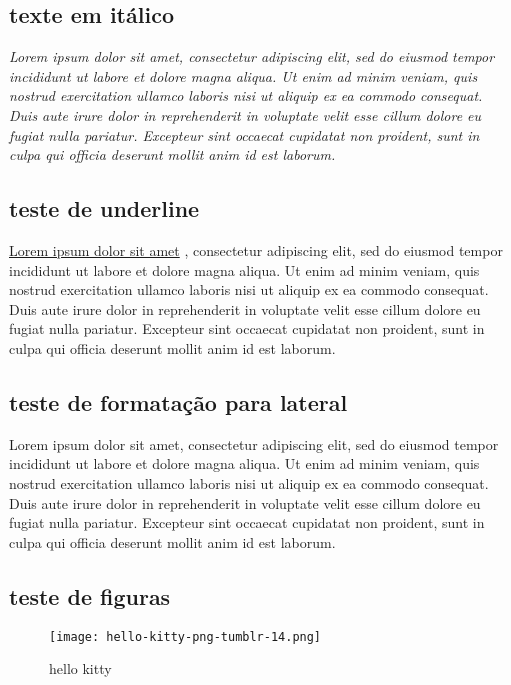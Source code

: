 \documentclass[a4paper, 12pt]{article} %
\begin{document}
\subsection{texte em itálico}
\textit{
Lorem ipsum dolor sit amet, consectetur adipiscing elit, sed do eiusmod tempor incididunt ut labore et dolore magna aliqua. Ut enim ad minim veniam, quis nostrud exercitation ullamco laboris nisi ut aliquip ex ea commodo consequat. Duis aute irure dolor in reprehenderit in voluptate velit esse cillum dolore eu fugiat nulla pariatur. Excepteur sint occaecat cupidatat non proident, sunt in culpa qui officia deserunt mollit anim id est laborum.} %

\subsection{teste de underline}
\underline{Lorem ipsum dolor sit amet} , consectetur adipiscing elit, sed do eiusmod tempor incididunt ut labore et dolore magna aliqua. Ut enim ad minim veniam, quis nostrud exercitation ullamco laboris nisi ut aliquip ex ea commodo consequat. Duis aute irure dolor in reprehenderit in voluptate velit esse cillum dolore eu fugiat nulla pariatur. Excepteur sint occaecat cupidatat non proident, sunt in culpa qui officia deserunt mollit anim id est laborum. %

\subsection{teste de formatação para lateral}
\begin{flushright}Lorem ipsum dolor sit amet, consectetur adipiscing elit, sed do eiusmod tempor incididunt ut labore et dolore magna aliqua. Ut enim ad minim veniam, quis nostrud exercitation ullamco laboris nisi ut aliquip ex ea commodo consequat. Duis aute irure dolor in reprehenderit in voluptate velit esse cillum dolore eu fugiat nulla pariatur. Excepteur sint occaecat cupidatat non proident, sunt in culpa qui officia deserunt mollit anim id est laborum.
\end{flushright} %

\subsection{teste de figuras}
\begin{figure}[ht]%

\centering %
\texttt{[image: hello-kitty-png-tumblr-14.png]} %
\caption{hello kitty} %
\label{Fig01} %

\end{figure}
\end{document}
